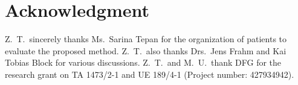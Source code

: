 \documentclass[journal,twoside,web]{ieeecolor}
\begin{document}
\begin{appendices}
%
%
%
%
%

\end{appendices}

\section*{Acknowledgment}

Z.~T.~sincerely thanks Ms.~Sarina Tepan 
for the organization of patients to evaluate the proposed method. 
Z.~T.~also thanks Drs.~Jens Frahm and Kai Tobias Block 
for various discussions.
Z.~T.~and M.~U.~thank DFG for the research grant 
on TA 1473/2-1 and UE 189/4-1 (Project number: 427934942). 





\end{document}
